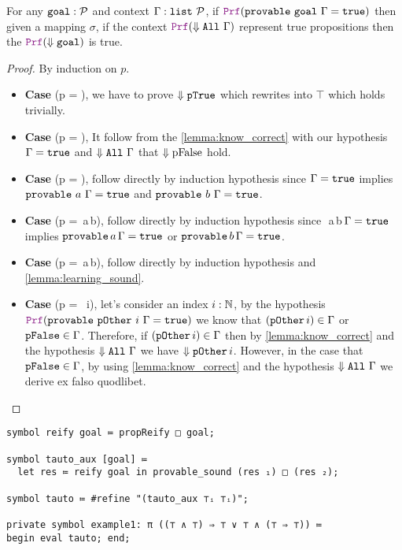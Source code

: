 \begin{theorem}
For any $\texttt{\upshape{goal}}: \mathcal{P}$ and context $\Gamma: \texttt{list}~\mathcal{P}$, if $\prf (\kw{provable}~\kw{goal}~\hyps = \true)$
then given a mapping $\sigma$, if the context $\prf (\deno{\kw{All}~\hyps})$ represent true propositions then the $\prf (\deno{\kw{goal}})$ is true.
\begin{proof} By induction on $p$.
\begin{itemize}
\item[] \textbf{Case} (p = ), we have to prove $\Downarrow \texttt{\upshape{pTrue}}$ which rewrites into $\top$ which holds trivially.
\item[] \textbf{Case} (p = ), It follow from the \cref{lemma:know_correct} with our hypothesis   $\Gamma = \texttt{\upshape{true}}$ and $\Downarrow \texttt{\upshape{All}}~\Gamma$ that $\Downarrow \text{pFalse}$ hold.
\item[] \textbf{Case} (p = ), follow directly by induction hypothesis since   $\Gamma = \texttt{\upshape{true}}$ implies $\texttt{\upshape{provable}}~a~\Gamma = \texttt{\upshape{true}}$ and $\texttt{\upshape{provable}}~b~\Gamma = \texttt{\upshape{true}}$.
\item[] \textbf{Case} (p = \,a\,b), follow directly by induction hypothesis since \,\,a\,b\,$\Gamma = \texttt{\upshape{true}}$ implies $\texttt{\upshape{provable}}\,a\,\Gamma = \texttt{\upshape{true}}$ or $\texttt{\upshape{provable}}\,b\,\Gamma = \texttt{\upshape{true}}$.
\item[] \textbf{Case} (p = \,a\,b), follow directly by induction hypothesis and \cref{lemma:learning_sound}.
\item[] \textbf{Case} (p = ~i), let's consider an index $i: \mathbb{N}$, by the hypothesis $\prf (\kw{provable}~\kw{pOther}~i~\hyps = \true)$  we know that $(\texttt{\upshape{pOther}}\,i) \in \Gamma$ or $\texttt{\upshape{pFalse}} \in \Gamma$. Therefore,
if $(\texttt{\upshape{pOther}}\,i) \in \Gamma$ then by \cref{lemma:know_correct} and the hypothesis $\Downarrow \texttt{\upshape{All}}~\Gamma$ we have $\Downarrow \texttt{\upshape{pOther}}\,i$. However,
in the case that $\texttt{\upshape{pFalse}} \in \Gamma$, by using \cref{lemma:know_correct} and the hypothesis $\Downarrow \texttt{\upshape{All}}~\Gamma$ we derive ex falso quodlibet.
\end{itemize}
\end{proof}
\end{theorem}

\begin{lstlisting}[language=Lambdapi, caption={Usage of Tauto}, label={lst:tauto-ex}]
symbol reify goal ≔ propReify □ goal;

symbol tauto_aux [goal] ≔
  let res ≔ reify goal in provable_sound (res ₁) □ (res ₂);

symbol tauto ≔ #refine "(tauto_aux ⊤ᵢ ⊤ᵢ)";

private symbol example1: π ((⊤ ∧ ⊤) ⇒ ⊤ ∨ ⊤ ∧ (⊤ ⇒ ⊤)) ≔
begin eval tauto; end;
\end{lstlisting}

